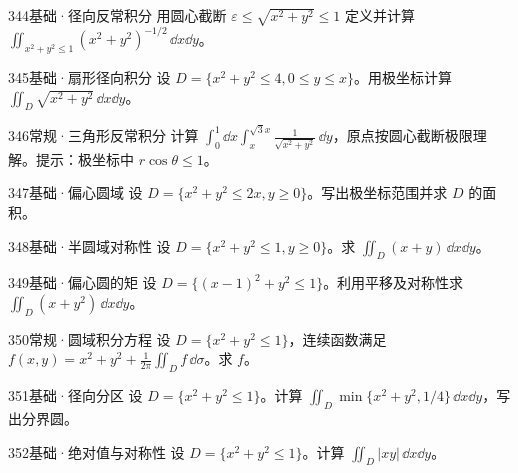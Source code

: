 \begin{exercise}{344}{基础·径向反常积分}
用圆心截断 $\varepsilon\leq\sqrt{x^2+y^2}\leq1$ 定义并计算 $\iint_{x^2+y^2\leq1}(x^2+y^2)^{-1/2}\,\dd x\dd y$。
\end{exercise}
\begin{exercise}{345}{基础·扇形径向积分}
设 $D=\{x^2+y^2\leq4,0\leq y\leq x\}$。用极坐标计算 $\iint_D\sqrt{x^2+y^2}\,\dd x\dd y$。
\end{exercise}
\begin{exercise}{346}{常规·三角形反常积分}
计算 $\int_0^1\dd x\int_x^{\sqrt3x}\frac1{\sqrt{x^2+y^2}}\,\dd y$，原点按圆心截断极限理解。提示：极坐标中 $r\cos\theta\leq1$。
\end{exercise}
\begin{exercise}{347}{基础·偏心圆域}
设 $D=\{x^2+y^2\leq2x,y\geq0\}$。写出极坐标范围并求 $D$ 的面积。
\end{exercise}
\begin{exercise}{348}{基础·半圆域对称性}
设 $D=\{x^2+y^2\leq1,y\geq0\}$。求 $\iint_D(x+y)\,\dd x\dd y$。
\end{exercise}
\begin{exercise}{349}{基础·偏心圆的矩}
设 $D=\{(x-1)^2+y^2\leq1\}$。利用平移及对称性求 $\iint_D(x+y^2)\,\dd x\dd y$。
\end{exercise}
\begin{exercise}{350}{常规·圆域积分方程}
设 $D=\{x^2+y^2\leq1\}$，连续函数满足 $f(x,y)=x^2+y^2+\frac1{2\pi}\iint_Df\,\dd\sigma$。求 $f$。
\end{exercise}
\begin{exercise}{351}{基础·径向分区}
设 $D=\{x^2+y^2\leq1\}$。计算 $\iint_D\min\{x^2+y^2,1/4\}\,\dd x\dd y$，写出分界圆。
\end{exercise}
\begin{exercise}{352}{基础·绝对值与对称性}
设 $D=\{x^2+y^2\leq1\}$。计算 $\iint_D|xy|\,\dd x\dd y$。
\end{exercise}
